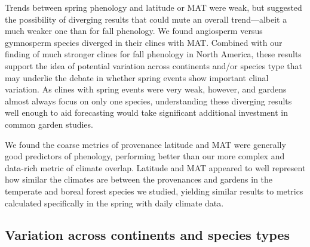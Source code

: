 \documentclass{article}
\begin{document}
Trends between spring phenology and latitude or MAT were weak, but suggested the possibility of diverging results that could mute an overall trend---albeit a much weaker one than for fall phenology. We found angiosperm versus gymnosperm species diverged in their clines with MAT. Combined with our finding of much stronger clines for fall phenology in North America, these results support the idea of potential variation across continents and/or species type that may underlie the debate in whether spring events show important clinal variation. As clines with spring events were very weak, however, and gardens almost always focus on only one species, understanding these diverging results well enough to aid forecasting would take significant additional investment in common garden studies. %

We found the coarse metrics of provenance latitude and MAT were generally good predictors of phenology, performing better than our more complex and data-rich metric of climate overlap. Latitude and MAT appeared to well represent how similar the climates are between the provenances and gardens in the temperate and boreal forest species we studied, yielding similar results to metrics calculated specifically in the spring with daily climate data. %

\subsection{Variation across continents and species types}
\end{document}
